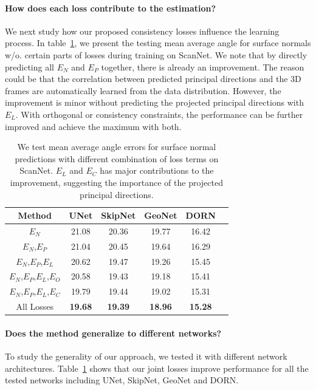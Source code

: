 \paragraph{How does each loss contribute to the estimation?}
We next study how our proposed consistency losses influence the learning process. In table~\ref{tab:framenet-consistency}, we present the testing mean average angle for surface normals w/o. certain parts of losses during training on ScanNet. We note that by directly predicting all $E_N$ and $E_P$ together, there is already an improvement. The reason could be that the correlation between predicted principal directions and the 3D frames are automatically learned from the data distribution. However, the improvement is minor without predicting the projected principal directions with $E_L$. With orthogonal or consistency constraints, the performance can be further improved and achieve the maximum with both.
\begin{table}
    \centering
    \tabcolsep=0.20cm
    \small
    \begin{tabular}{|c|c|c|c|c|c|}
        \hline
         Method & UNet & SkipNet & GeoNet & DORN\\
         \hline
         $E_N$ & 21.08 & 20.36 & 19.77 & 16.42\\
         \hline
         $E_N$,$E_P$ & 21.04 & 20.45 & 19.64 & 16.29\\
         \hline
         $E_N$,$E_P$,$E_L$ & 20.62 & 19.47 & 19.26 & 15.45\\
         \hline
         $E_N$,$E_P$,$E_L$,$E_O$ & 20.58 & 19.43 & 19.18 & 15.41\\
         \hline
         $E_N$,$E_P$,$E_L$,$E_C$ & 19.79 & 19.44 & 19.02 & 15.31\\
         \hline
         All Losses & \textbf{19.68} & \textbf{19.39} & \textbf{18.96} & \textbf{15.28}\\
         \hline
    \end{tabular}
    \caption{We test mean average angle errors for surface normal predictions with different combination of loss terms on ScanNet. $E_L$ and $E_C$ has major contributions to the improvement, suggesting the importance of the projected principal directions.}
    \label{tab:framenet-consistency}
\end{table}

\vspace{-0.1in}
\paragraph{Does the method generalize to different networks?}  To study the generality of our approach, we tested it with different network architectures.   Table~\ref{tab:framenet-consistency} shows that our joint losses improve performance for all the tested networks including UNet\cite{ronneberger2015u}, SkipNet\cite{bansal2016marr}, GeoNet\cite{qi2018geonet} and DORN\cite{fu2018deep}.

